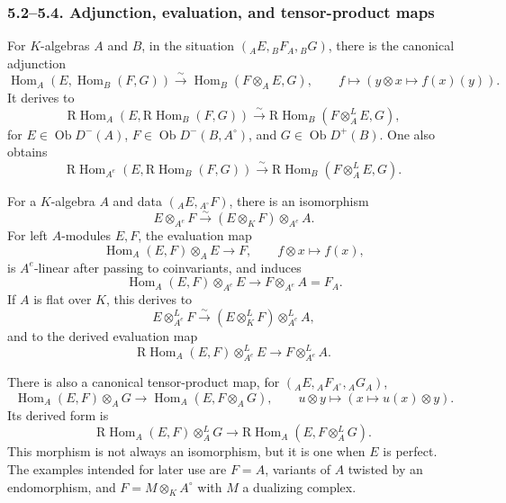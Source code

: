 \documentclass[11pt]{article}
\theoremstyle{plain}
\theoremstyle{definition}
\theoremstyle{remark}
\DeclareMathOperator{\Hom}{Hom}
\DeclareMathOperator{\ob}{Ob}
\newcommand{\R}{\mathrm R}
\begin{document}
\subsubsection*{5.2--5.4. Adjunction, evaluation, and tensor-product maps}
For $K$-algebras $A$ and $B$, in the situation $({}_AE,{}_BF_A,{}_BG)$, there is the canonical adjunction
\begin{equation}
\Hom_A(E,\Hom_B(F,G))\xrightarrow{\sim}\Hom_B(F\otimes_AE,G),
\qquad f\mapsto (y\otimes x\mapsto f(x)(y)).                    \tag{5.2.1}
\end{equation}
It derives to
\begin{equation}
\R\Hom_A(E,\R\Hom_B(F,G))\xrightarrow{\sim}
\R\Hom_B(F\otimes_A^LE,G),                                      \tag{5.2.2}
\end{equation}
for $E\in\ob D^-(A)$, $F\in\ob D^-(B,A^{\circ})$, and $G\in\ob D^+(B)$. One also obtains
\begin{equation}
\R\Hom_{A^e}(E,\R\Hom_B(F,G))\xrightarrow{\sim}
\R\Hom_B(F\otimes_A^LE,G).                                      \tag{5.2.3}
\end{equation}

For a $K$-algebra $A$ and data $({}_AE,{}_{A^{\circ}}F)$, there is an isomorphism
\begin{equation}
   E\otimes_{A^e}F\xrightarrow{\sim}(E\otimes_KF)\otimes_{A^e}A.
   \tag{5.3.1}
\end{equation}
For left $A$-modules $E,F$, the evaluation map
\begin{equation}
   \Hom_A(E,F)\otimes_AE\to F,
   \qquad f\otimes x\mapsto f(x),                               \tag{5.3.2}
\end{equation}
is $A^e$-linear after passing to coinvariants, and induces
\begin{equation}
   \Hom_A(E,F)\otimes_{A^e}E\to F\otimes_{A^e}A=F_A.              \tag{5.3.3}
\end{equation}
If $A$ is flat over $K$, this derives to
\begin{equation}
   E\otimes_{A^e}^LF\xrightarrow{\sim}(E\otimes_K^LF)\otimes_{A^e}^LA, \tag{5.3.4}
\end{equation}
and to the derived evaluation map
\begin{equation}
   \R\Hom_A(E,F)\otimes_{A^e}^LE\to F\otimes_{A^e}^LA.             \tag{5.3.5}
\end{equation}

There is also a canonical tensor-product map, for $({}_AE,{}_AF_{A^{\circ}},{}_AG_A)$,
\begin{equation}
   \Hom_A(E,F)\otimes_AG\to \Hom_A(E,F\otimes_AG),
   \qquad u\otimes y\mapsto (x\mapsto u(x)\otimes y).             \tag{5.4.1}
\end{equation}
Its derived form is
\begin{equation}
   \R\Hom_A(E,F)\otimes_A^LG\to \R\Hom_A(E,F\otimes_A^LG).         \tag{5.4.2}
\end{equation}
This morphism is not always an isomorphism, but it is one when $E$ is perfect. The examples intended for later use are $F=A$, variants of $A$ twisted by an endomorphism, and $F=M\otimes_KA^{\circ}$ with $M$ a dualizing complex.
\end{document}
